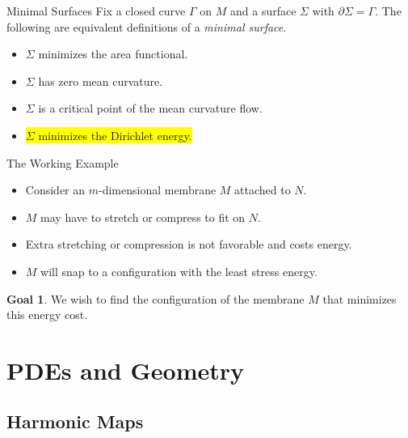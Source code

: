 \documentclass[usenames,dvipsnames]{beamer}
\theoremstyle{definition}
\newtheorem*{goal}{Goal}
\theoremstyle{theorem}
\begin{document}
        \begin{frame}{Minimal Surfaces}
             Fix a closed curve $\Gamma$ on $M$ and a surface $\Sigma$ with $\partial \Sigma = \Gamma$. The following are equivalent definitions of a \emph{minimal surface}.
            \begin{itemize}
                \item $\Sigma$ minimizes the area functional.
                \item $\Sigma$ has zero mean curvature.
                \item $\Sigma$ is a critical point of the mean curvature flow.
                \item \colorbox<1>{yellow}{$\Sigma$ minimizes the Dirichlet energy.}
            \end{itemize}
        \end{frame}
        
        \begin{frame}{The Working Example}
            \begin{itemize}
                \item Consider an $m$-dimensional membrane $M$ attached to $N$.
                \item $M$ may have to stretch or compress to fit on $N$.
                \item Extra stretching or compression is not favorable and costs energy.
                \item $M$ will snap to a configuration with the least stress energy.
            \end{itemize}
            \pause
            \begin{goal}
            We wish to find the configuration of the membrane $M$ that minimizes this energy cost.
            \end{goal}
        \end{frame} 
        
\section{PDEs and Geometry}

    \subsection{Harmonic Maps}
\end{document}
